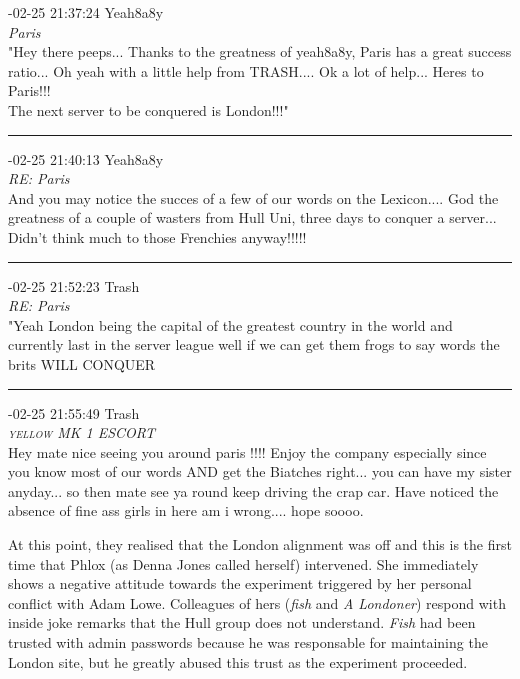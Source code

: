 \begin{mail}

{-02-25 21:37:24 Yeah8a8y}\\
{\itshape Paris}\\
"Hey there peeps... Thanks to the greatness of yeah8a8y, Paris has a great success ratio... Oh yeah with a little help from TRASH.... Ok a lot of help... Heres to Paris!!!\\
The next server to be conquered is London!!!"\\

\rule{0.8\textwidth}{.4pt}

{-02-25 21:40:13 Yeah8a8y}\\
{\itshape RE: Paris}\\
And you may notice the succes of a few of our words on the Lexicon.... God the greatness of a couple of wasters from Hull Uni, three days to conquer a server... Didn't think much to those Frenchies anyway!!!!!\\

\rule{0.8\textwidth}{.4pt}

{-02-25 21:52:23 Trash}\\
{\itshape RE: Paris}\\
"Yeah London being the capital of the greatest country in the world and currently last in the server league well if we can get them frogs to say words the brits WILL CONQUER\\

\rule{0.8\textwidth}{.4pt}

{-02-25 21:55:49 Trash}\\
{\itshape \textsc{yellow} MK 1 ESCORT}\\
Hey mate nice seeing you around paris !!!! Enjoy the company especially since you know most of our words AND get the Biatches right... you can have my sister anyday... so then mate see ya round keep driving the crap car.	
Have noticed the absence of fine ass girls in here am i wrong.... hope soooo.
\end{mail}

At this point, they realised that the London alignment was off and this is the first time that Phlox (as Denna 
Jones called herself) intervened. She immediately shows
a negative attitude towards the experiment triggered by her personal conflict with Adam Lowe. 
Colleagues of hers ({\itshape fish} and {\itshape A Londoner}) respond with inside joke
remarks that the Hull group does not understand. {\itshape Fish} had been trusted with admin passwords because he
was responsable for maintaining the London site, but he greatly abused this trust as the experiment proceeded. 


